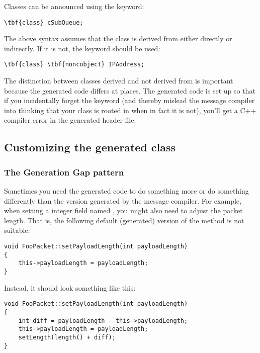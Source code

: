 Classes can be announced using the  keyword:

\begin{Verbatim}[commandchars=\\\{\}]
\tbf{class} cSubQueue;
\end{Verbatim}

The above syntax assumes that the class is derived from 
either directly or indirectly. If it is not, the 
keyword should be used:

\begin{Verbatim}[commandchars=\\\{\}]
\tbf{class} \tbf{noncobject} IPAddress;
\end{Verbatim}

The distinction between classes derived and not derived from 
is important because the generated code differs at places.
The generated code is set up so that if you incidentally
forget the  keyword (and thereby mislead the
message compiler into thinking that your class is rooted in
 when in fact it is not), you'll get a C++ compiler
error in the generated header file.


\subsection{Customizing the generated class}
\label{sec:ch-messages:customizing-generated-class}


\subsubsection{The Generation Gap pattern}

Sometimes you need the generated code to do something
more or do something differently than the version generated
by the message compiler.
For example, when setting a integer field named ,
you might also need to adjust the packet length. That is,
the following default (generated) version of the
 method is not suitable:

\begin{verbatim}
void FooPacket::setPayloadLength(int payloadLength)
{
    this->payloadLength = payloadLength;
}
\end{verbatim}

Instead, it should look something like this:

\begin{verbatim}
void FooPacket::setPayloadLength(int payloadLength)
{
    int diff = payloadLength - this->payloadLength;
    this->payloadLength = payloadLength;
    setLength(length() + diff);
}
\end{verbatim}

